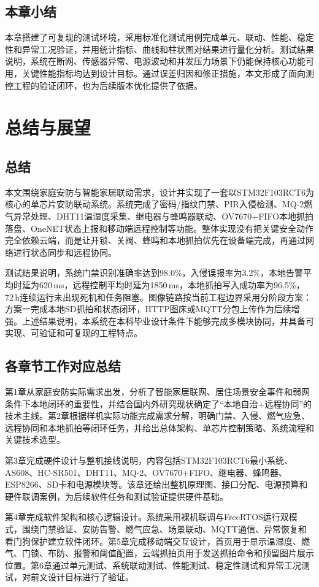 \documentclass[UTF8,12pt,a4paper,oneside]{ctexbook}
\numberwithin{equation}{chapter}
\begin{document}
\section{本章小结}
本章搭建了可复现的测试环境，采用标准化测试用例完成单元、联动、性能、稳定性和异常工况验证，并用统计指标、曲线和柱状图对结果进行量化分析。测试结果说明，系统在断网、传感器异常、电源波动和并发压力场景下仍能保持核心功能可用，关键性能指标均达到设计目标。通过误差归因和修正措施，本文形成了面向测控工程的验证闭环，也为后续版本优化提供了依据。

\chapter{总结与展望}
\section{总结}
本文围绕家庭安防与智能家居联动需求，设计并实现了一套以STM32F103RCT6为核心的单芯片安防联动系统。系统完成了密码/指纹门禁、PIR入侵检测、MQ-2燃气异常处理、DHT11温湿度采集、继电器与蜂鸣器联动、OV7670+FIFO本地抓拍落盘、OneNET状态上报和移动端远程控制等功能。整体实现没有把关键安全动作完全依赖云端，而是让开锁、关阀、蜂鸣和本地抓拍优先在设备端完成，再通过网络进行状态同步和远程协同。

测试结果说明，系统门禁识别准确率达到98.0\%，入侵误报率为3.2\%，本地告警平均时延为620\,ms，远程控制平均时延为1850\,ms，本地抓拍写入成功率为96.5\%，72\,h连续运行未出现死机和任务阻塞。图像链路按当前工程边界采用分阶段方案：方案一完成本地SD抓拍和状态闭环，HTTP图床或MQTT分包上传作为后续增强。上述结果说明，本系统在本科毕业设计条件下能够完成多模块协同，并具备可实现、可验证和可复现的工程特点。
\section{各章节工作对应总结}
第1章从家庭安防实际需求出发，分析了智能家居联网、居住场景安全事件和弱网条件下本地闭环的重要性，并结合国内外研究现状确定了“本地自治+远程协同”的技术主线。第2章根据样机实际功能完成需求分解，明确门禁、入侵、燃气应急、远程协同和本地抓拍等闭环任务，并给出总体架构、单芯片控制策略、系统流程和关键技术选型。

第3章完成硬件设计与整机接线说明，内容包括STM32F103RCT6最小系统、AS608、HC-SR501、DHT11、MQ-2、OV7670+FIFO、继电器、蜂鸣器、ESP8266、SD卡和电源模块等。该章还给出整机原理图、接口分配、电源预算和硬件联调案例，为后续软件任务和测试验证提供硬件基础。

第4章完成软件架构和核心逻辑设计。系统采用裸机联调与FreeRTOS运行双模式，围绕门禁验证、安防告警、燃气应急、场景联动、MQTT通信、异常恢复和看门狗保护建立软件闭环。第5章完成移动端交互设计，首页用于显示温湿度、燃气、门锁、布防、报警和阈值配置，云端抓拍页用于发送抓拍命令和预留图片展示位置。第6章通过单元测试、系统联动测试、性能测试、稳定性测试和异常工况测试，对前文设计目标进行了验证。
\end{document}
